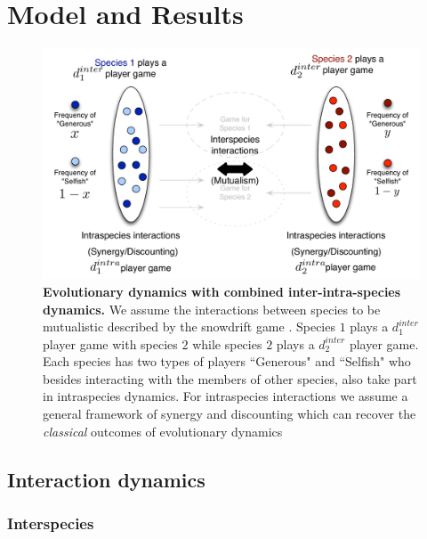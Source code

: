 \documentclass[12pt]{article}
\begin{document}
\section{Model and Results}


\begin{figure}
\begin{center}
\includegraphics[scale=0.5]{Figures/interintra.pdf}
\caption{\small{
\textbf{Evolutionary dynamics with combined inter-intra-species dynamics.}
We assume the interactions between species to be mutualistic described by the snowdrift game \citep{bergstrom:PNAS:2003,souza:JTB:2009,gokhale:PRSB:2012}.
Species $1$ plays a $d_1^{inter}$ player game with species $2$ while species $2$ plays a $d_2^{inter}$ player game.
Each species has two types of players ``Generous" and ``Selfish" who besides interacting with the members of other species, also take part in intraspecies dynamics.
For intraspecies interactions we assume a general framework of synergy and discounting which can recover the \textit{classical} outcomes of evolutionary dynamics \citep{eshel:AmNat:1988,hauert:JTB:2006a,nowak:book:2006}
}
\label{fig:conceptart}
}
\end{center}
\end{figure}


\subsection{Interaction dynamics}
\subsubsection{Interspecies}
\end{document}
